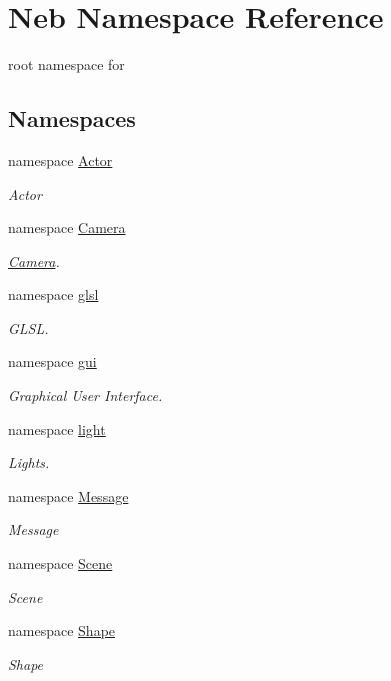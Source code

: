 \hypertarget{namespaceNeb}{\section{\-Neb \-Namespace \-Reference}
\label{namespaceNeb}
}


root namespace for   


\subsection*{\-Namespaces}
\begin{DoxyCompactItemize}
\item 
namespace \hyperlink{namespaceNeb_1_1Actor}{\-Actor}
\begin{DoxyCompactList}\small\item\em \-Actor \end{DoxyCompactList}\item 
namespace \hyperlink{namespaceNeb_1_1Camera}{\-Camera}
\begin{DoxyCompactList}\small\item\em \hyperlink{namespaceNeb_1_1Camera}{\-Camera}. \end{DoxyCompactList}\item 
namespace \hyperlink{namespaceNeb_1_1glsl}{glsl}
\begin{DoxyCompactList}\small\item\em \-G\-L\-S\-L. \end{DoxyCompactList}\item 
namespace \hyperlink{namespaceNeb_1_1gui}{gui}
\begin{DoxyCompactList}\small\item\em \-Graphical \-User \-Interface. \end{DoxyCompactList}\item 
namespace \hyperlink{namespaceNeb_1_1light}{light}
\begin{DoxyCompactList}\small\item\em \-Lights. \end{DoxyCompactList}\item 
namespace \hyperlink{namespaceNeb_1_1Message}{\-Message}
\begin{DoxyCompactList}\small\item\em \-Message \end{DoxyCompactList}\item 
namespace \hyperlink{namespaceNeb_1_1Scene}{\-Scene}
\begin{DoxyCompactList}\small\item\em \-Scene \end{DoxyCompactList}\item 
namespace \hyperlink{namespaceNeb_1_1Shape}{\-Shape}
\begin{DoxyCompactList}\small\item\em \-Shape \end{DoxyCompactList}\end{DoxyCompactItemize}
